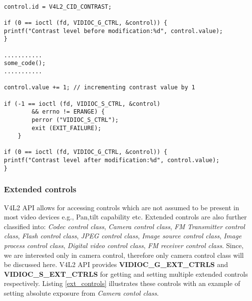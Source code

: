\documentclass{article}
\begin{document}
\begin{lstlisting}[label=get_set_user_cont,caption=Getting and setting user class controls]

control.id = V4L2_CID_CONTRAST;

if (0 == ioctl (fd, VIDIOC_G_CTRL, &control)) {
printf("Contrast level before modification:%d", control.value);	
}

...........
some_code();
...........

control.value += 1; // incrementing contrast value by 1

if (-1 == ioctl (fd, VIDIOC_S_CTRL, &control)
	    && errno != ERANGE) {
		perror ("VIDIOC_S_CTRL");
		exit (EXIT_FAILURE);
	}

if (0 == ioctl (fd, VIDIOC_G_CTRL, &control)) {
printf("Contrast level after modification:%d", control.value);	
}
\end{lstlisting}

\subsubsection{Extended controls}
V4L2 API allows for accessing controls which are not assumed to be present in most video devices e.g., Pan,tilt capability etc. Extended controls are also further classified into: \textit{Codec control class}, \textit{Camera control class}, \textit{FM Transmitter control class}, \textit{Flash control class}, \textit{JPEG control class}, \textit{Image source control class}, \textit{Image process control class}, \textit{Digital video control class}, \textit{FM receiver control class}. Since, we are interested only in camera control, therefore only camera control class will be discussed here. V4L2 API provides \textbf{VIDIOC\_G\_EXT\_CTRLS} and \textbf{VIDIOC\_S\_EXT\_CTRLS} for getting and setting multiple extended controls respectively. Listing \ref{ext_controls} illustrates these controls with an example of setting absolute exposure from \textit{Camera contol class}.
\end{document}
